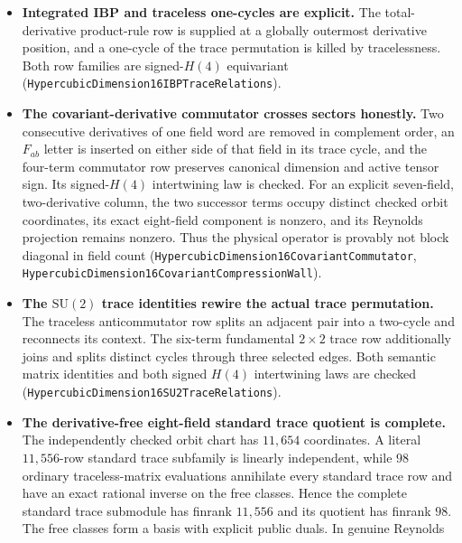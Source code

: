 \documentclass[11pt]{article}
\theoremstyle{definition}
\begin{document}
\begin{itemize}
    only at an innermost derivative of the selected field word.  Their signed
    $H(4)$ intertwining laws are checked, and EOM remains disabled in the
    off-shell policy
    (\texttt{HypercubicDimension16DifferentialRelations}).
  \item \textbf{Integrated IBP and traceless one-cycles are explicit.}
    The total-derivative product-rule row is supplied at a globally outermost
    derivative position, and a one-cycle of the trace permutation is killed
    by tracelessness.  Both row families are signed-$H(4)$ equivariant
    (\texttt{HypercubicDimension16IBPTraceRelations}).
  \item \textbf{The covariant-derivative commutator crosses sectors
    honestly.} Two consecutive derivatives of one field word are removed in
    complement order, an $F_{ab}$ letter is inserted on either side of that
    field in its trace cycle, and the four-term commutator row preserves
    canonical dimension and active tensor sign.  Its signed-$H(4)$
    intertwining law is checked.  For an explicit seven-field,
    two-derivative column, the two successor terms occupy distinct checked
    orbit coordinates, its exact eight-field component is nonzero, and its
    Reynolds projection remains nonzero.  Thus the physical operator is
    provably not block diagonal in field count
    (\texttt{HypercubicDimension16CovariantCommutator},
    \texttt{HypercubicDimension16CovariantCompressionWall}).
  \item \textbf{The $\mathrm{SU}(2)$ trace identities rewire the actual trace
    permutation.} The traceless anticommutator row splits an adjacent pair
    into a two-cycle and reconnects its context.  The six-term fundamental
    $2\times2$ trace row additionally joins and splits distinct cycles through
    three selected edges.  Both semantic matrix identities and both signed
    $H(4)$ intertwining laws are checked
    (\texttt{HypercubicDimension16SU2TraceRelations}).
  \item \textbf{The derivative-free eight-field standard trace quotient is
    complete.} The independently checked orbit chart has $11{,}654$
    coordinates.  A literal $11{,}556$-row standard trace subfamily is
    linearly independent, while $98$ ordinary traceless-matrix evaluations
    annihilate every standard trace row and have an exact rational inverse on
    the free classes.  Hence the complete standard trace submodule has
    finrank $11{,}556$ and its quotient has finrank $98$.  The free classes
    form a basis with explicit public duals.  In genuine Reynolds

\end{itemize}
\end{document}
